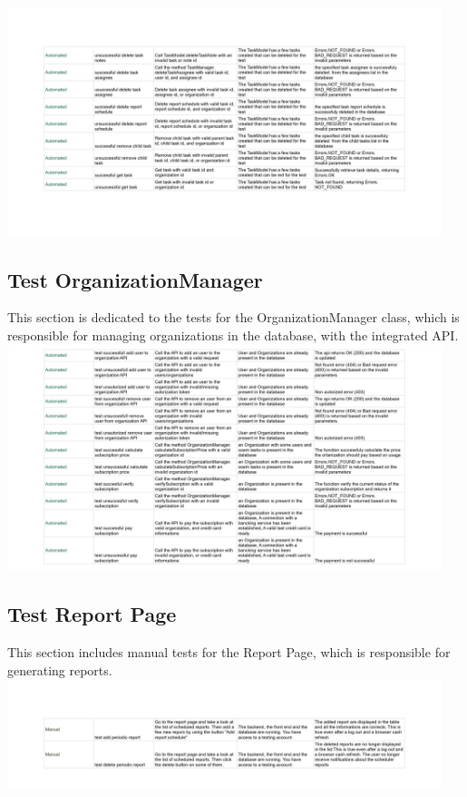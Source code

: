\documentclass{article}
\begin{document}
\newline
\includegraphics[width=0.95\textwidth]{images/Test_DatabaseManagerTaskManager-immagini-1.jpg}
\subsection*{Test OrganizationManager}
This section is dedicated to the tests for the OrganizationManager class, which is responsible for managing organizations in the database, with the integrated API.
\newline
\includegraphics[width=0.95\textwidth]{images/Test_OrganizationManager.jpg}

\subsection*{Test Report Page}
This section includes manual tests for the Report Page, which is responsible for generating reports.
\newline
\includegraphics[width=0.95\textwidth]{images/Test_ReportPage.jpg}
\end{document}
